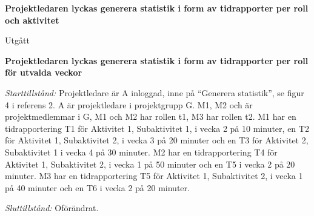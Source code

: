 \documentclass[a4paper]{article}
\begin{document}
\begin{FT}
\item
\textbf{Projektledaren lyckas generera statistik i form av tidrapporter per roll och aktivitet}

Utgått





\item
\textbf{Projektledaren lyckas generera statistik i form av tidrapporter per roll för utvalda veckor}

\emph{Starttillstånd:} Projektledare är A inloggad, inne på ``Generera statistik'', se figur 4 i referens 2. A är projektledare i projektgrupp G. M1, M2 och är projektmedlemmar i G, M1 och M2 har rollen t1, M3 har rollen t2. M1 har en tidrapportering T1 för Aktivitet 1, Subaktivitet 1, i vecka 2 på 10 minuter, en T2 för Aktivitet 1, Subaktivitet 2, i vecka 3 på 20 minuter och en T3 för Aktivitet 2, Subaktivitet 1 i vecka 4 på 30 minuter. M2 har en tidrapportering T4 för Aktivitet 1, Subaktivitet 2, i vecka 1 på 50 minuter och en T5 i vecka 2 på 20 minuter. M3 har en tidrapportering T5 för Aktivitet 1, Subaktivitet 2, i vecka 1 på 40 minuter och en T6 i vecka 2 på 20 minuter.

\emph{Sluttillstånd:} Oförändrat.


\end{FT}
\end{document}
